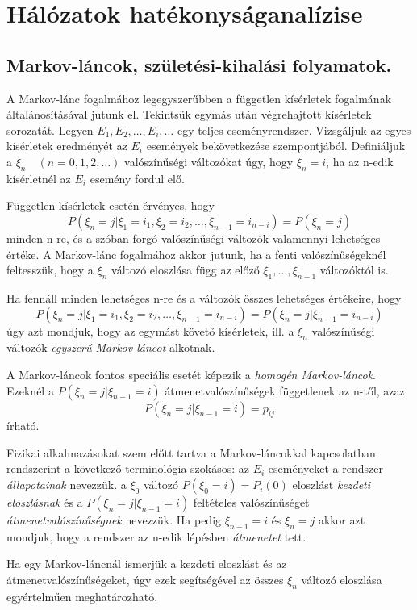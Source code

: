 \section{Hálózatok hatékonyságanalízise}
\subsection{Markov-láncok, születési-kihalási folyamatok.}
A Markov-lánc fogalmához legegyszerűbben a független kísérletek fogalmának általánosításával jutunk el. Tekintsük egymás után végrehajtott  kísérletek sorozatát. Legyen $E_1,E_2,\dots,E_i,\dots$ egy teljes eseményrendszer. Vizsgáljuk az egyes kísérletek eredményét az $E_i$ események bekövetkezése szempontjából. Definiáljuk a $\xi_n\quad(n=0,1,2,\dots)$ valószínűségi változókat úgy, hogy $\xi_n=i$, ha az n-edik kísérletnél az $E_i$ esemény fordul elő.

Független kísérletek esetén érvényes, hogy
$$P(\xi_n=j|\xi_1=i_1,\xi_2=i_2,\dots,\xi_{n-1}=i_{n-i})=P(\xi_n=j)$$
minden n-re, és a szóban forgó valószínűségi változók valamennyi lehetséges értéke. A Markov-lánc fogalmához akkor jutunk, ha a fenti valószínűségeknél feltesszük, hogy a $\xi_n$ változó eloszlása függ az előző $\xi_1,\dots,\xi_{n-1}$ változóktól is.

Ha fennáll minden lehetséges n-re és a változók összes lehetséges értékeire, hogy
$$P(\xi_n=j|\xi_1=i_1,\xi_2=i_2,\dots,\xi_{n-1}=i_{n-i})=P(\xi_n=j|\xi_{n-1}=i_{n-i})$$
úgy azt mondjuk, hogy az egymást követő kísérletek, ill. a $\xi_n$ valószínűségi változók \emph{egyszerű Markov-láncot} alkotnak.

A Markov-láncok fontos speciális esetét képezik a \emph{homogén Markov-láncok}. Ezeknél a  $P(\xi_n=j|\xi_{n-1}=i)$ átmenetvalószínűségek  függetlenek az n-től, azaz
$$P(\xi_n=j|\xi_{n-1}=i)=p_{ij}$$
írható.

Fizikai alkalmazásokat szem előtt tartva a Markov-láncokkal kapcsolatban rendszerint a következő terminológia szokásos: az $E_i$ eseményeket a rendszer \emph{állapotainak} nevezzük. a $\xi_0$ változó $P(\xi_0=i)=P_i(0)$ eloszlást \emph{kezdeti eloszlásnak} és a $P(\xi_n=j|\xi_{n-1}=i)$ feltételes valószínűséget \emph{átmenetvalószínűségnek} nevezzük. Ha pedig $\xi_{n-1}=i$ és $\xi_n=j$ akkor azt mondjuk, hogy a rendszer az n-edik lépésben \emph{átmenetet} tett.

Ha egy Markov-láncnál ismerjük a kezdeti eloszlást és az átmenetvalószínűségeket, úgy ezek segítségével az összes $\xi_n$ változó eloszlása egyértelműen meghatározható.


